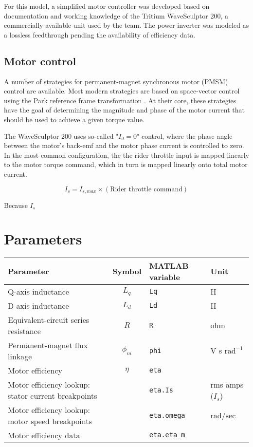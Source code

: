 \documentclass[../SimBALink.tex]{subfiles}
\begin{document}
	For this model, a simplified motor controller was developed based on documentation and working knowledge of the Tritium WaveSculptor 200, a commercially available unit used by the team. The power inverter was modeled as a lossless feedthrough pending the availability of efficiency data.
	
	\subsection{Motor control}
		A number of strategies for permanent-magnet synchronous motor (PMSM) control are available. Most modern strategies are based on space-vector control using the Park reference frame transformation \cite{Park1929}. At their core, these strategies have the goal of determining the magnitude and phase of the motor current that should be used to achieve a given torque value.
		
		The WaveSculptor 200 uses so-called "$I_d = 0$" control, where the phase angle between the motor's back-emf and the motor phase current is controlled to zero. In the most common configuration, the the rider throttle input is mapped linearly to the motor torque command, which in turn is mapped linearly onto total motor current.
		
		\begin{equation}
			I_s = I_{s,max} \times (\text{Rider throttle command})
		\end{equation}
		
		Because $I_s$
\section{Parameters}
	
	\renewcommand{\arraystretch}{1.5}
	\begin{tabular}{ p{5cm} | c | l | l }
		Parameter					&	Symbol				&	MATLAB variable	&	Unit						\\\hline	
		Q-axis inductance				&	$L_q$				&	\texttt{Lq}			&	H			\\
		D-axis inductance				&	$L_d$				&	\texttt{Ld}			&	H			\\
		Equivalent-circuit series resistance	&	$R$					&	\texttt{R}			&	ohm			\\
		Permanent-magnet flux linkage	&	$\phi_m$				&	\texttt{phi}		&	V s $\text{rad}^{-1}$	\\
		Motor efficiency				&	$\eta$				&	\texttt{eta}		&				\\
		Motor efficiency lookup: stator current breakpoints	&			&	\texttt{eta.Is}		&	rms amps ($I_s$)	\\
		Motor efficiency lookup: motor speed breakpoints	&			&	\texttt{eta.omega}	& 	rad/sec		\\
		Motor efficiency data			&						&	\texttt{eta.eta\_m}	&	
	\end{tabular}
\end{document}
